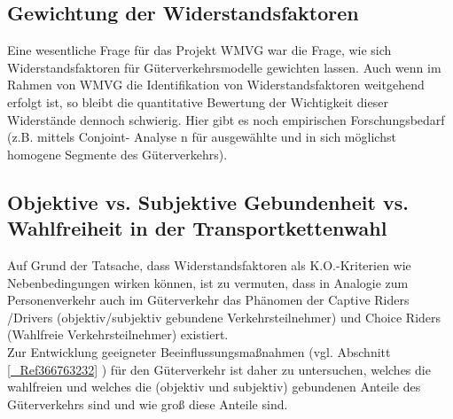 % 
\subsection{Gewichtung der Widerstandsfaktoren}
\label{_Toc365801616}
\label{_Toc366766126}
\label{_Toc366775320}

\label{_Ref361848281}
\label{_Toc363572057}
\label{_Toc363601754}Eine wesentliche Frage für das Projekt WMVG war die Frage, wie sich Widerstandsfaktoren für Güterverkehrsmodelle gewichten lassen. Auch wenn im Rahmen von WMVG die Identifikation von Widerstandsfaktoren weitgehend erfolgt ist, so bleibt die quantitative Bewertung der Wichtigkeit dieser Widerstände dennoch schwierig. Hier gibt es noch empirischen Forschungsbedarf (z.B. mittels%
 Conjoint-%
Analyse%
n%
 für ausgewählte %
und in sich möglichst homogene %
Segmente%
 des Güterverkehrs).~\\


% 
\subsection{Objektive vs. Subjektive Gebundenheit vs. Wahlfreiheit in der Transportkettenwahl }
\label{_Toc365801617}
\label{_Toc366766127}
\label{_Toc366775321}
Auf Grund der Tatsache, dass Widerstandsfaktoren als K.O.-Kriterien wie Nebenbedingungen wirken können, ist zu vermuten, dass in Analogie zum Personenverkehr auch im Güterverkehr das Phänomen der Captive Riders /Drivers (objektiv/subjektiv gebundene Verkehrsteilnehmer) und Choice Riders (Wahlfreie Verkehrsteilnehmer)  \autocites[][]{bib.336} \autocites[][]{bib.75} existiert. ~\\
Zur Entwicklung geeigneter Beeinflussungsmaßnahmen (vgl. Abschnitt \autoref{_Ref366763232} ) für den Güterverkehr ist daher zu untersuchen, welches die wahlfreien und welches die (objektiv und subjektiv) gebundenen Anteile des Güterverkehrs sind und wie groß diese Anteile sind.~\\


